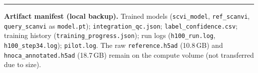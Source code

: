 \documentclass[11pt]{article}
\begin{document}
\vspace{1em}
\hrule
\vspace{0.6em}
\footnotesize
\textbf{Artifact manifest (local backup).} Trained models (\texttt{scvi\_model}, \texttt{ref\_scanvi}, \texttt{query\_scanvi} as \texttt{model.pt}); \texttt{integration\_qc.json}; \texttt{label\_confidence.csv}; training history (\texttt{training\_progress.json}); run logs (\texttt{h100\_run.log}, \texttt{h100\_step34.log}); \texttt{pilot.log}. The raw \texttt{reference.h5ad} (10.8\,GB) and \texttt{hnoca\_annotated.h5ad} (18.7\,GB) remain on the compute volume (not transferred due to size).
\end{document}
